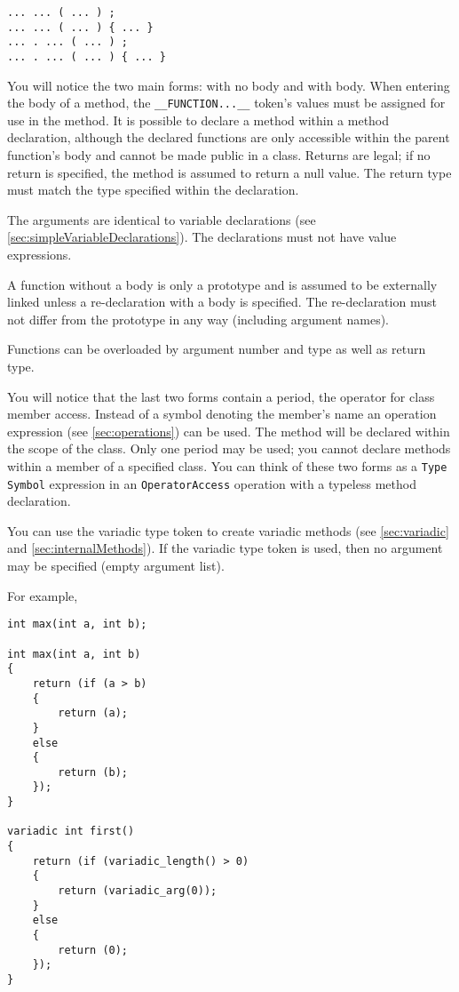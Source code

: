 \documentclass[10pt,a4paper]{article}
\begin{document}
\begin{verbatim}
... ... ( ... ) ;
... ... ( ... ) { ... }
... . ... ( ... ) ;
... . ... ( ... ) { ... }
\end{verbatim}

You will notice the two main forms: with no body and with body. When entering the body of a method, the \verb|__FUNCTION...__| token's values must be assigned for use in the method. It is possible to declare a method within a method declaration, although the declared functions are only accessible within the parent function's body and cannot be made public in a class. Returns are legal; if no return is specified, the method is assumed to return a null value. The return type must match the type specified within the declaration.

The arguments are identical to variable declarations (see \ref{sec:simpleVariableDeclarations}). The declarations must not have value expressions.

A function without a body is only a prototype and is assumed to be externally linked unless a re-declaration with a body is specified. The re-declaration must not differ from the prototype in any way (including argument names).

Functions can be overloaded by argument number and type as well as return type.

You will notice that the last two forms contain a period, the operator for class member access. Instead of a symbol denoting the member's name an operation expression (see \ref{sec:operations}) can be used. The method will be declared within the scope of the class. Only one period may be used; you cannot declare methods within a member of a specified class. You can think of these two forms as a \verb|Type Symbol| expression in an \verb|OperatorAccess| operation with a typeless method declaration.

You can use the variadic type token to create variadic methods (see \ref{sec:variadic} and \ref{sec:internalMethods}). If the variadic type token is used, then no argument may be specified (empty argument list).

For example,
\begin{verbatim}
int max(int a, int b);

int max(int a, int b)
{
    return (if (a > b)
    {
        return (a);
    }
    else
    {
        return (b);
    });
}

variadic int first()
{
	return (if (variadic_length() > 0)
	{
    	return (variadic_arg(0));
    }
    else
    {
    	return (0);
    });
}
\end{verbatim}
\end{document}
